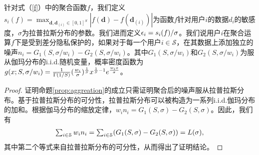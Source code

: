 	\begin{pp}\label{prop:aggreation}
		针对式（\ref{f}）中的聚合函数$f$，我们定义$s_i(f)=\max_{\mathbf{d},\mathbf{d}_{(i)}\in[0,1]^S}|f(\mathbf{d})-f(\mathbf{d}_{(i)})|$为函数$f$针对用户$i$的数据$d_i$的敏感度，$\sigma$为拉普拉斯分布的参数。我们进而定义$\epsilon_i=s_i(f)/\sigma$。我们说用户$i$在聚合运算$f$下是受到差分隐私保护的，如果对于每一个用户$i\in\mathcal{S}$，在其数据上添加独立的噪声$n_i=G_1(S,\sigma/w_i)-G_2(S,\sigma/w_i)$。其中$G_1(S,\sigma/w_i)$和$G_2(S,\sigma/w_i)$为服从伽玛分布的i.i.d.随机变量，概率密度函数为$g(x;S,\sigma/w_i)=\frac{1}{\Gamma(1/S)}\large(\frac{w_i}{\sigma}\large)^{\frac{1}{S}}x^{\frac{1}{S}-1}e^{\frac{w_ix}{\sigma}}$。
	\end{pp}
	
	\begin{proof}
		证明命题\ref{prop:aggreation}的成立只需证明聚合后的噪声服从拉普拉斯分布。基于拉普拉斯分布\cite{kotz2012laplace}的可分性，拉普拉斯分布可以被构造为一系列i.i.d.伽玛分布的加和。根据伽马分布的缩放定律，$w_in_i=G_1(S,\sigma)-G_2(S,\sigma)$。因此，我们有
		\begin{equation}
		\begin{array}
		[c]{lll}%
		\sum_{i\in\mathcal{S}}w_in_i=\sum_{i\in\mathcal{S}}(G_1(S,\sigma)-G_2(S,\sigma))=L(\sigma),
		\end{array}
		\end{equation}
		其中第二个等式来自拉普拉斯分布\cite{kotz2012laplace}的可分性，从而得出了证明结论。
	\end{proof}

